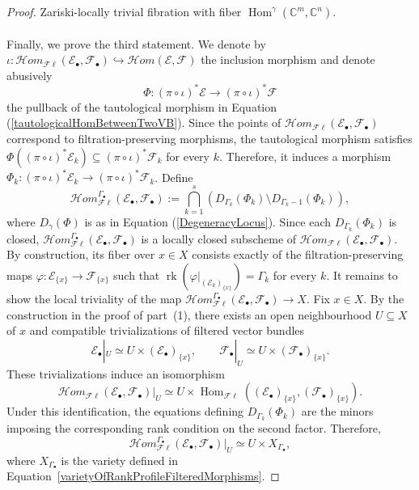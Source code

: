 \documentclass{amsart}
\theoremstyle{plain}
\numberwithin{equation}{section}
\theoremstyle{definition}
\theoremstyle{remark}
\begin{document}
\begin{proof}
		Zariski-locally trivial fibration with fiber
		\(\operatorname{Hom}^{\gamma}(\mathbb C^m,\mathbb C^n)\).
		\\
		\\
		Finally, we prove the third statement. We denote by $\iota:\mathcal{H}om_{\mathcal{F}\ell}(\mathcal{E}_\bullet,\mathcal{F}_\bullet)\hookrightarrow\mathcal{H}om(\mathcal{E},\mathcal{F})$ the inclusion morphism and denote abusively
		\[
		\Phi:(\pi\circ \iota)^*\mathcal E\longrightarrow (\pi\circ \iota)^*\mathcal F
		\]
		the pullback of the tautological morphism in Equation (\ref{tautologicalHomBetweenTwoVB}).
		Since the points of $\mathcal{H}om_{\mathcal{F}\ell}(\mathcal{E}_\bullet,\mathcal{F}_\bullet)$ correspond to
		filtration-preserving morphisms, the tautological morphism satisfies
		$\Phi((\pi\circ \iota)^*\mathcal E_k)\subseteq (\pi\circ\iota)^*\mathcal F_k$
		for every $k$. Therefore, it induces a morphism $\Phi_k:(\pi\circ \iota)^*\mathcal E_k\longrightarrow (\pi\circ \iota)^*\mathcal F_k	$. Define
		$$
		\mathcal{H}om_{\mathcal{F}\ell}^{\Gamma_\bullet}(\mathcal{E}_\bullet,\mathcal{F}_\bullet)
		:=
		\bigcap_{k=1}^s
		\left(
		D_{\Gamma_k}(\Phi_k)\setminus D_{\Gamma_k-1}(\Phi_k)
		\right),
		$$
		where $D_{\gamma}(\Phi)$ is as in Equation (\ref{DegeneracyLocus}). Since each
		$D_{\Gamma_k}(\Phi_k)$ is closed, $\mathcal{H}om_{\mathcal{F}\ell}^{ \Gamma_\bullet}(\mathcal{E}_\bullet,\mathcal{F}_\bullet)$ is a locally closed subscheme of $\mathcal{H}om_{\mathcal{F}\ell}(\mathcal{E}_\bullet,\mathcal{F}_\bullet)$. By construction, its fiber over
		$x\in X$ consists exactly of the filtration-preserving maps $\varphi:\mathcal E_{\{x\}}\to \mathcal F_{\{x\}}$
		such that $\operatorname{rk}(\varphi|_{(\mathcal{E}_{k})_{\{x\}}})=\Gamma_k$ for every $k$. It remains to show the local triviality of the map $\mathcal{H}om^{\Gamma_\bullet}_{\mathcal{F}\ell}(\mathcal{E}_\bullet,\mathcal{F}_\bullet)\to X$. Fix \(x\in X\). By the construction in the proof of part~(1), there
		exists an open neighbourhood \(U\subseteq X\) of \(x\) and compatible
		trivializations of filtered vector bundles
		\[
		\mathcal E_\bullet|_U
		\simeq
		U\times(\mathcal E_\bullet)_{\{x\}},
		\qquad
		\mathcal F_\bullet|_U
		\simeq
		U\times(\mathcal F_\bullet)_{\{x\}}.
		\]
		These trivializations induce an isomorphism
		\[
		\mathcal H om_{\mathcal F\ell}
		(\mathcal E_\bullet,\mathcal F_\bullet)|_U
		\simeq
		U\times
		\operatorname{Hom}_{\mathcal F\ell}
		\left(
		(\mathcal E_\bullet)_{\{x\}},
		(\mathcal F_\bullet)_{\{x\}}
		\right).
		\]
		Under this identification, the equations defining
		\(D_{\Gamma_k}(\Phi_k)\) are the minors imposing the corresponding rank
		condition on the second factor. Therefore,
		\[
		\mathcal H om_{\mathcal F\ell}^{\Gamma_\bullet}
		(\mathcal E_\bullet,\mathcal F_\bullet)|_U
		\simeq
		U\times X_{\Gamma_\bullet},
		\]
		where \(X_{\Gamma_\bullet}\) is the variety defined in
		Equation~\eqref{varietyOfRankProfileFilteredMorphisms}.
	\end{proof}
\end{document}
